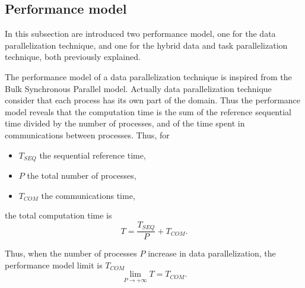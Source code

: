 \subsection{Performance model}

In this subsection are introduced two performance model, one for the data parallelization technique, and one for the hybrid data and task parallelization technique, both previously explained.

The performance model of a data parallelization technique is inspired from the Bulk Synchronous Parallel model. Actually data parallelization technique consider that each process has its own part of the domain. Thus the performance model reveals that the computation time is the sum of the reference sequential time divided by the number of processes, and of the time spent in communications between processes. Thus, for
\begin{itemize}
\item $T_{SEQ}$ the sequential reference time, 
\item $P$ the total number of processes, 
\item $T_{COM}$ the communications time, 
\end{itemize}
the total computation time is
\begin{equation}
T = \frac{T_{SEQ}}{P} + T_{COM}.
\end{equation}


Thus, when the number of processes $P$ increase in data parallelization, the performance model limit is $T_{COM}$
\begin{equation}
\lim\limits_{P \rightarrow +\infty} T = T_{COM}.
\end{equation}


